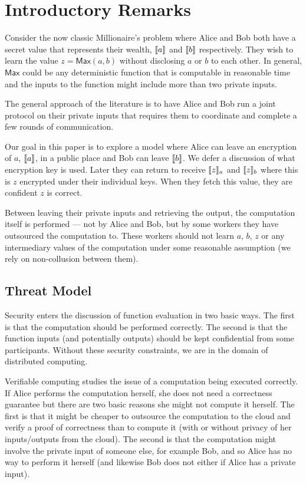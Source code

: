 \section{Introductory Remarks}

Consider the now classic Millionaire's problem where Alice and Bob both have a secret value that represents their wealth, $\llbracket a \rrbracket$ and $\llbracket b \rrbracket$ respectively. They wish to learn the value $z=\mathsf{Max}(a,b)$ without disclosing $a$ or $b$ to each other. In general, $\mathsf{Max}$ could be any deterministic function that is computable in reasonable time and the inputs to the function might include more than two private inputs. 

The general approach of the literature is to have Alice and Bob run a joint protocol on their private inputs that requires them to coordinate and complete a few rounds of communication.

Our goal in this paper is to explore a model where Alice can leave an encryption of $a$, $\llbracket a \rrbracket$, in a public place and Bob can leave $\llbracket b \rrbracket$. We defer a discussion of what encryption key is used. Later they can return to receive $\llbracket z \rrbracket_a$ and $\llbracket z \rrbracket_b$ where this is $z$ encrypted under their individual keys. When they fetch this value, they are confident $z$ is correct.

Between leaving their private inputs and retrieving the output, the computation itself is performed --- not by Alice and Bob, but by some workers they have outsourced the computation to. These workers should not learn $a$, $b$, $z$ or any intermediary values of the computation under some reasonable assumption (we rely on non-collusion between them). 


\subsection{Threat Model}

Security enters the discussion of function evaluation in two basic ways. The first is that the computation should be performed correctly. The second is that the function inputs (and potentially outputs) should be kept confidential from some participants. Without these security constraints, we are in the domain of distributed computing.

Verifiable computing studies the issue of a computation being executed correctly. If Alice performs the computation herself, she does not need a correctness guarantee but there are two basic reasons she might not compute it herself. The first is that it might be cheaper to outsource the computation to the cloud and verify a proof of correctness than to compute it (with or without privacy of her inputs/outputs from the cloud). The second is that the computation might involve the private input of someone else, for example Bob, and so Alice has no way to perform it herself (and likewise Bob does not either if Alice has a private input).

